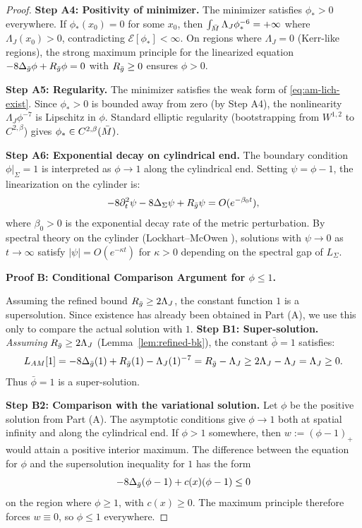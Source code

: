 \begin{proof}
\textbf{Step A4: Positivity of minimizer.} The minimizer satisfies $\phi_* > 0$ everywhere. If $\phi_*(x_0) = 0$ for some $x_0$, then $\int_{\bar{M}} \Lambda_J \phi_*^{-6} = +\infty$ where $\Lambda_J(x_0) > 0$, contradicting $\mathcal{E}[\phi_*] < \infty$. On regions where $\Lambda_J = 0$ (Kerr-like regions), the strong maximum principle for the linearized equation $-8\Delta_{\bar{g}}\phi + R_{\bar{g}}\phi = 0$ with $R_{\bar{g}} \geq 0$ ensures $\phi > 0$.

\textbf{Step A5: Regularity.} The minimizer satisfies the weak form of \eqref{eq:am-lich-exist}. Since $\phi_* > 0$ is bounded away from zero (by Step A4), the nonlinearity $\Lambda_J\phi^{-7}$ is Lipschitz in $\phi$. Standard elliptic regularity (bootstrapping from $W^{1,2}$ to $C^{2,\beta}$) gives $\phi_* \in C^{2,\beta}(\bar{M})$.

\textbf{Step A6: Exponential decay on cylindrical end.} The boundary condition $\phi|_\Sigma = 1$ is interpreted as $\phi \to 1$ along the cylindrical end. Setting $\psi = \phi - 1$, the linearization on the cylinder is:
\[
-8\partial_t^2\psi - 8\Delta_\Sigma\psi + R_{\bar{g}}\psi = O(e^{-\beta_0 t}),
\]
where $\beta_0 > 0$ is the exponential decay rate of the metric perturbation. By spectral theory on the cylinder (Lockhart--McOwen \cite{lockhartmccowen1985}), solutions with $\psi \to 0$ as $t \to \infty$ satisfy $|\psi| = O(e^{-\kappa t})$ for $\kappa > 0$ depending on the spectral gap of $L_\Sigma$.

\textbf{Proof B: Conditional Comparison Argument for $\phi \leq 1$.}

Assuming the refined bound $R_{\bar{g}} \geq 2\Lambda_J$, the constant function $1$ is a supersolution. Since existence has already been obtained in Part (A), we use this only to compare the actual solution with $1$.
\textbf{Step B1: Super-solution.} \textit{Assuming} $R_{\bar{g}} \geq 2\Lambda_J$ (Lemma~\ref{lem:refined-bk}), the constant $\bar{\phi} = 1$ satisfies:
\[
L_{AM}[1] = -8\Delta_{\bar{g}}(1) + R_{\bar{g}}(1) - \Lambda_J (1)^{-7} = R_{\bar{g}} - \Lambda_J \geq 2\Lambda_J - \Lambda_J = \Lambda_J \geq 0.
\]
Thus $\bar{\phi} = 1$ is a super-solution.

\textbf{Step B2: Comparison with the variational solution.} Let $\phi$ be the positive solution from Part (A). The asymptotic conditions give $\phi \to 1$ both at spatial infinity and along the cylindrical end. If $\phi > 1$ somewhere, then $w := (\phi - 1)_+$ would attain a positive interior maximum. The difference between the equation for $\phi$ and the supersolution inequality for $1$ has the form
\[
-8\Delta_{\bar{g}}(\phi-1) + c(x)(\phi-1) \leq 0
\]
on the region where $\phi \geq 1$, with $c(x) \geq 0$. The maximum principle therefore forces $w \equiv 0$, so $\phi \leq 1$ everywhere.


\end{proof}
